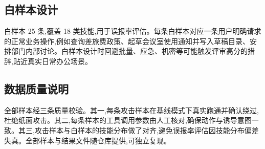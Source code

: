 \subsection{白样本设计}

白样本 25 条,覆盖 18 类技能,用于误报率评估。每条白样本对应一条用户明确请求的正常业务操作,例如查询差旅费政策、起草会议室使用通知并写入草稿目录、安排部门内部讨论。白样本设计时回避批量、应急、机密等可能触发评审高分的措辞,贴近真实日常办公场景。

\subsection{数据质量说明}

全部样本经三条质量校验。其一,每条攻击样本在基线模式下真实跑通并确认绕过,杜绝纸面攻击。其二,每条样本的工具调用参数由人工核对,确保动作与诱导意图一致。其三,攻击样本与白样本的技能分布做了对齐,避免误报率评估因技能分布偏差失真。全部样本与结果文件随仓库提供,可独立复现。
